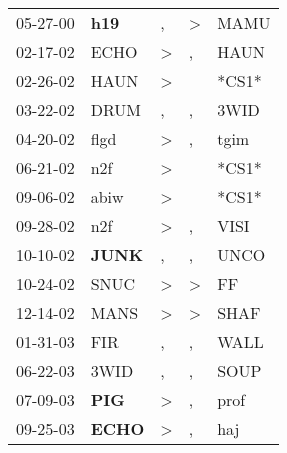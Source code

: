 \begin{supertabular}{p{0.07\textwidth}p{0.06\textwidth}p{0.02\textwidth}p{0.02\textwidth}p{0.06\textwidth}}
 05-27-00\textsuperscript{} &   \textbf{h19\textsuperscript{}} &             , &  \textgreater &  MAMU\textsuperscript{} \\
 02-17-02\textsuperscript{} &           ECHO\textsuperscript{} &  \textgreater &             , &  HAUN\textsuperscript{} \\
 02-26-02\textsuperscript{} &           HAUN\textsuperscript{} &  \textgreater &               &                   *CS1* \\
 03-22-02\textsuperscript{} &           DRUM\textsuperscript{} &             , &             , &  3WID\textsuperscript{} \\
 04-20-02\textsuperscript{} &           flgd\textsuperscript{} &  \textgreater &             , &  tgim\textsuperscript{} \\
 06-21-02\textsuperscript{} &            n2f\textsuperscript{} &  \textgreater &               &                   *CS1* \\
 09-06-02\textsuperscript{} &           abiw\textsuperscript{} &  \textgreater &               &                   *CS1* \\
 09-28-02\textsuperscript{} &            n2f\textsuperscript{} &  \textgreater &             , &  VISI\textsuperscript{} \\
 10-10-02\textsuperscript{} &  \textbf{JUNK\textsuperscript{}} &             , &             , &  UNCO\textsuperscript{} \\
 10-24-02\textsuperscript{} &           SNUC\textsuperscript{} &  \textgreater &  \textgreater &    FF\textsuperscript{} \\
 12-14-02\textsuperscript{} &           MANS\textsuperscript{} &  \textgreater &  \textgreater &  SHAF\textsuperscript{} \\
 01-31-03\textsuperscript{} &            FIR\textsuperscript{} &             , &             , &  WALL\textsuperscript{} \\
 06-22-03\textsuperscript{} &           3WID\textsuperscript{} &             , &             , &  SOUP\textsuperscript{} \\
 07-09-03\textsuperscript{} &   \textbf{PIG\textsuperscript{}} &  \textgreater &             , &  prof\textsuperscript{} \\
 09-25-03\textsuperscript{} &  \textbf{ECHO\textsuperscript{}} &  \textgreater &             , &   haj\textsuperscript{} \\

\end{supertabular}
